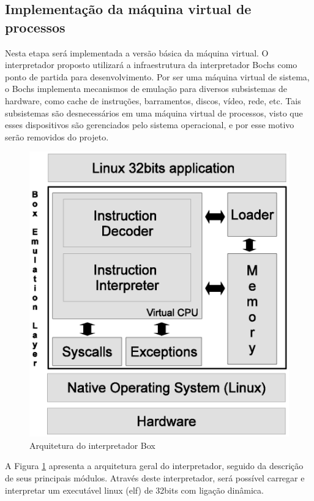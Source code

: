 \documentclass[11pt,twoside]{article}
\begin{document}
\subsection{Implementação da máquina virtual de processos}

Nesta etapa será implementada a versão básica da máquina virtual.
O interpretador proposto utilizará a infraestrutura da interpretador Bochs como ponto de partida para desenvolvimento. 
Por ser uma máquina virtual de sistema, o Bochs implementa mecanismos de emulação para diversos subsistemas de hardware, como cache de instruções, barramentos, discos, vídeo, rede, etc.
Tais subsistemas são desnecessários em uma máquina virtual de processos, visto que esses dispositivos são gerenciados pelo sistema operacional, e por esse motivo serão removidos do projeto.

\begin{figure}[h]
 \centering
 \includegraphics[width=0.5\columnwidth]{./figures/box-architecture.eps}
 \caption{Arquitetura do interpretador Box}
 \label{fig:box-architecture}
\end{figure}

A Figura \ref{fig:box-architecture} apresenta a arquitetura geral do interpretador, seguido da descrição de seus principais módulos.
Através deste interpretador, será possível carregar e interpretar um executável linux (elf) de 32bits com ligação dinâmica.
\end{document}
